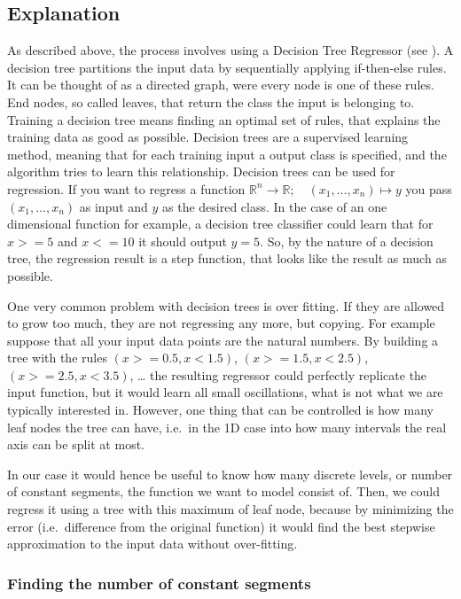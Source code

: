 \documentclass[12pt,a4paper]{article}
\begin{document}
\hypertarget{explanation}{%
\subsection{Explanation}\label{explanation}}

As described above, the process involves using a Decision Tree Regressor (see \cite{scikit-learn:DecisionTrees}). A decision tree partitions the input data by sequentially
applying if-then-else rules. It can be thought of as a directed graph, were every node is one of these rules. End nodes, so called leaves, that return the class the input is belonging to. Training a decision tree means finding an optimal set of rules, that explains the training data as good as possible. Decision trees are a supervised learning method, meaning that for each training input a output class is specified, and the algorithm tries to learn this relationship. Decision trees can be used for regression. If you want to regress a function \(\mathbb R^n \to \mathbb R; \quad (x_1, \dots, x_n) \mapsto y\) you
pass \((x_1, \dots, x_n)\) as input and \(y\) as the desired class. In the case of an one dimensional function for example, a decision tree classifier could learn that for \(x>=5\) and \(x<=10\) it should output \(y=5\). So, by the nature of a decision tree, the regression result is a step function, that looks like the result as much as possible.

One very common problem with decision trees is over fitting. If they are allowed to grow too much, they are not regressing any more, but copying. For example suppose that all your input data points are the natural numbers. By building a tree with the rules \((x >= 0.5, x <1.5)\), \((x >= 1.5, x <2.5)\), \((x >= 2.5, x <3.5)\), \ldots{} the resulting regressor could perfectly replicate the input function, but it would learn all small oscillations, what is not what we are typically interested in. However, one thing that can be controlled is how many leaf nodes the tree can have, i.e.~in the 1D case into how many intervals the real axis can be split at most.

In our case it would hence be useful to know how many discrete levels, or number of constant segments, the function we want to model consist of. Then, we could regress it using a tree with this maximum of leaf node, because by minimizing the error (i.e.~difference from the original function) it would find the best stepwise approximation to the input data without over-fitting.

\hypertarget{finding-the-number-of-constant-segments}{%
\subsubsection{Finding the number of constant segments}\label{finding-the-number-of-constant-segments}}
\end{document}
